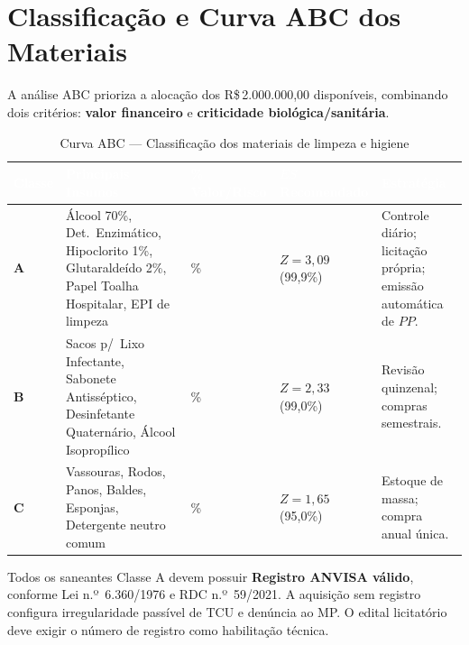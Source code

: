 \documentclass[12pt,a4paper]{article}
\begin{document}
\section{Classificação e Curva ABC dos Materiais}

A análise ABC prioriza a alocação dos R\$\,2.000.000,00 disponíveis, combinando dois critérios: \textbf{valor financeiro} e \textbf{criticidade biológica/sanitária}.

\begin{table}[H]
\centering
\caption{Curva ABC --- Classificação dos materiais de limpeza e higiene}
\label{tab:abc}
\small
{}
\begin{tabular}{>{\centering\arraybackslash\bfseries}p{1cm} p{4.8cm} >{\centering\arraybackslash}p{2cm} >{\centering\arraybackslash}p{2cm} p{3.2cm}}
  \rowcolor{navyblue}
  \textcolor{white}{\textbf{Classe}} &
  \textcolor{white}{\textbf{Principais Insumos}} &
  \textcolor{white}{\textbf{\% Valor/Risco}} &
  \textcolor{white}{\textbf{$ES$ Recomendado}} &
  \textcolor{white}{\textbf{Estratégia}} \\
  \toprule
  A & Álcool 70\%, Det.\ Enzimático, Hipoclorito 1\%, Glutaraldeído 2\%, Papel Toalha Hospitalar, EPI de limpeza & 80\% & $Z = 3{,}09$ (99{,}9\%) & Controle diário; licitação própria; emissão automática de $PP$. \\
  B & Sacos p/\ Lixo Infectante, Sabonete Antisséptico, Desinfetante Quaternário, Álcool Isopropílico & 15\% & $Z = 2{,}33$ (99{,}0\%) & Revisão quinzenal; compras semestrais. \\
  C & Vassouras, Rodos, Panos, Baldes, Esponjas, Detergente neutro comum & 5\% & $Z = 1{,}65$ (95{,}0\%) & Estoque de massa; compra anual única. \\
  \bottomrule
\end{tabular}
\end{table}

\begin{alertbox}
Todos os saneantes Classe A devem possuir \textbf{Registro ANVISA válido}, conforme Lei n.º~6.360/1976 e RDC n.º~59/2021. A aquisição sem registro configura irregularidade passível de TCU e denúncia ao MP. O edital licitatório deve exigir o número de registro como habilitação técnica.
\end{alertbox}

\end{document}

